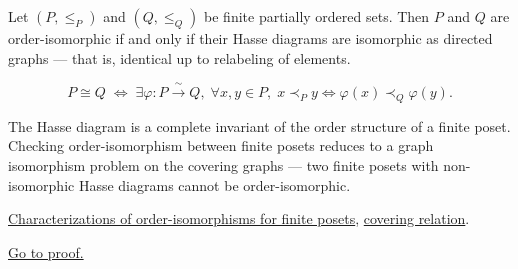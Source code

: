 
\begin{proposition}
\label{prop:hasse-diagram-characterization}
Let $(P, \leq_P)$ and $(Q, \leq_Q)$ be finite partially ordered sets.
Then $P$ and $Q$ are order-isomorphic if and only if their Hasse diagrams
are isomorphic as directed graphs — that is, identical up to relabeling
of elements.
\end{proposition}

\begin{remark*}
\[
P \cong Q
\;\Longleftrightarrow\;
\exists \varphi : P \xrightarrow{\;\sim\;} Q,\;
\forall x, y \in P,\;
x \prec_P y \Leftrightarrow \varphi(x) \prec_Q \varphi(y).
\]
\end{remark*}

\begin{remark*}[Interpretation]
The Hasse diagram is a complete invariant of the order structure of a
finite poset.  Checking order-isomorphism between finite posets reduces
to a graph isomorphism problem on the covering graphs — two finite posets
with non-isomorphic Hasse diagrams cannot be order-isomorphic.
\end{remark*}

\begin{remark*}[Dependencies]
\hyperref[lem:order-iso-finite-characterizations]{Characterizations of order-isomorphisms for finite posets},
\hyperref[def:covering-relation]{covering relation}.
\end{remark*}

\begin{remark*}[Proof]
\hyperref[prf:hasse-diagram-characterization]{Go to proof.}
\end{remark*}
